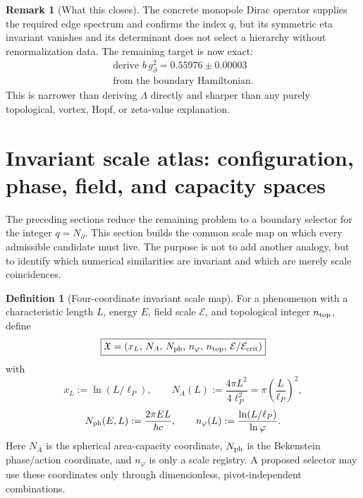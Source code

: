 \documentclass[aps,prd,reprint,nofootinbib,superscriptaddress,floatfix]{revtex4-2}
\numberwithin{equation}{section}
\theoremstyle{definition}
\newtheorem{definition}{Definition}[section]
\newtheorem{remark}{Remark}[section]
\theoremstyle{plain}
\begin{document}
\begin{remark}[What this closes]
The concrete monopole Dirac operator supplies the required edge spectrum
and confirms the index \(q\), but its symmetric eta invariant vanishes and
its determinant does not select a hierarchy without renormalization data.
The remaining target is now exact:
\[
\boxed{
\begin{gathered}
\text{derive } b\,g_\partial^2=0.55976\pm0.00003\\
\text{from the boundary Hamiltonian.}
\end{gathered}}
\]
This is narrower than deriving \(\Lambda\) directly and sharper than any
purely topological, vortex, Hopf, or zeta-value explanation.
\end{remark}



\section{Invariant scale atlas: configuration, phase, field, and capacity spaces}\label{sec:scale-atlas}

The preceding sections reduce the remaining problem to a boundary selector for
the integer \(q=N_\partial\).  This section builds the common scale map on
which every admissible candidate must live.  The purpose is not to add another
analogy, but to identify which numerical similarities are invariant and which
are merely scale coincidences.

\begin{definition}[Four-coordinate invariant scale map]
For a phenomenon with a characteristic length \(L\), energy \(E\), field scale
\(\mathcal E\), and topological integer \(n_{\rm top}\), define
\begin{equation}
\boxed{
\mathfrak X
=
\left(
x_L,\,
N_A,\,
N_{\rm ph},\,
n_\varphi,\,
n_{\rm top},\,
\mathcal E/\mathcal E_{\rm crit}
\right)
}
\end{equation}
with
\begin{equation}
x_L:=\ln(L/\ell_P),\qquad
N_A(L):=\frac{4\pi L^2}{4\ell_P^2}
       =\pi\left(\frac{L}{\ell_P}\right)^2,
\end{equation}
\begin{equation}
N_{\rm ph}(E,L):=\frac{2\pi E L}{\hbar c},
\qquad
n_\varphi(L):=\frac{\ln(L/\ell_P)}{\ln\varphi}.
\end{equation}
Here \(N_A\) is the spherical area-capacity coordinate, \(N_{\rm ph}\)
is the Bekenstein phase/action coordinate, and \(n_\varphi\) is only a
scale registry.  A proposed selector may use these coordinates only through
dimensionless, pivot-independent combinations.
\end{definition}
\end{document}

